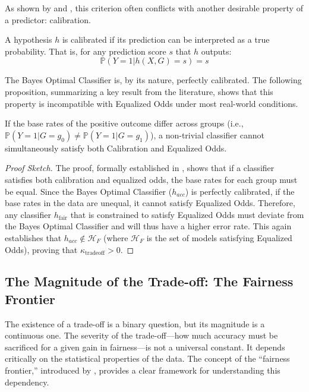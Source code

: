As shown by \citet{Kleinberg2017} and \citet{Chouldechova2017}, this criterion often conflicts with another desirable property of a predictor: calibration.

\begin{definition}[Calibration]
A hypothesis $h$ is calibrated if its prediction can be interpreted as a true probability. That is, for any prediction score $s$ that $h$ outputs:
\begin{equation}
\mathbb{P}(Y=1 | h(X,G)=s) = s
\end{equation}
\end{definition}

The Bayes Optimal Classifier is, by its nature, perfectly calibrated. The following proposition, summarizing a key result from the literature, shows that this property is incompatible with Equalized Odds under most real-world conditions.

\begin{proposition}
If the base rates of the positive outcome differ across groups (i.e., $\mathbb{P}(Y=1 | G=g_0) \neq \mathbb{P}(Y=1 | G=g_1)$), a non-trivial classifier cannot simultaneously satisfy both Calibration and Equalized Odds.
\end{proposition}

\begin{proof}[Proof Sketch]
The proof, formally established in \citet{Kleinberg2017}, shows that if a classifier satisfies both calibration and equalized odds, the base rates for each group must be equal. Since the Bayes Optimal Classifier ($h_{acc}$) is perfectly calibrated, if the base rates in the data are unequal, it cannot satisfy Equalized Odds. Therefore, any classifier $h_{\text{fair}}$ that is constrained to satisfy Equalized Odds must deviate from the Bayes Optimal Classifier and will thus have a higher error rate. This again establishes that $h_{acc} \notin \mathcal{H}_F$ (where $\mathcal{H}_F$ is the set of models satisfying Equalized Odds), proving that $\kappa_{\text{tradeoff}} > 0$.
\end{proof}

\subsection{The Magnitude of the Trade-off: The Fairness Frontier}

The existence of a trade-off is a binary question, but its magnitude is a continuous one. The severity of the trade-off—how much accuracy must be sacrificed for a given gain in fairness—is not a universal constant. It depends critically on the statistical properties of the data. The concept of the ``fairness frontier,'' introduced by \citet{Liang2025}, provides a clear framework for understanding this dependency.

